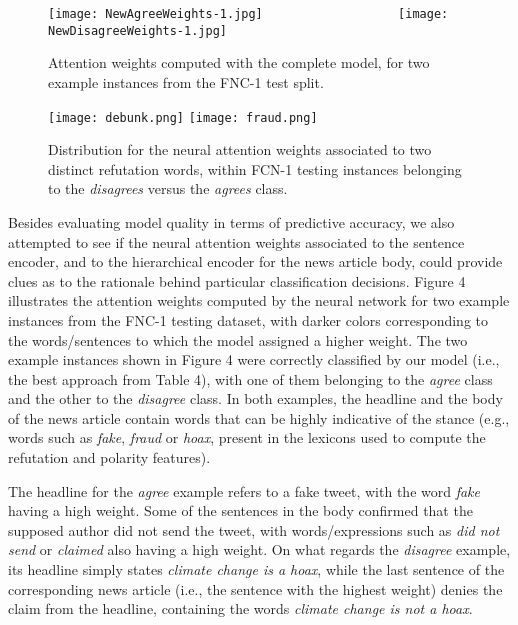 \begin{figure}[t!]
  \begin{center}
  \texttt{[image: NewAgreeWeights-1.jpg]} ~~~~~~~~~~~~~~~~~~ \texttt{[image: NewDisagreeWeights-1.jpg]}
  \caption{Attention weights computed with the complete model, for two example instances from the FNC-1 test split.}
  \label{fig:att1}
  \end{center}
\end{figure}



\begin{figure}[b!]
  \begin{center}
  \texttt{[image: debunk.png]}  
  \texttt{[image: fraud.png]} 
  \caption{Distribution for the neural attention weights associated to two distinct refutation words, within FCN-1 testing instances belonging to the {\it disagrees} versus the {\it agrees} class.}
  \label{fig:att1}
  \end{center}
\end{figure}

Besides evaluating model quality in terms of predictive accuracy, we also attempted to see if the neural attention weights associated to the sentence encoder, and to the hierarchical encoder for the news article body, could provide clues as to the rationale behind particular classification decisions. Figure 4 illustrates the attention weights computed by the neural network for two example instances from the FNC-1 testing dataset, with darker colors corresponding to the words/sentences to which the model assigned a higher weight. The two example instances shown in Figure 4 were correctly classified by our model (i.e., the best approach from Table 4), with one of them belonging to the \textit{agree} class and the other to the \textit{disagree} class. In both examples, the headline and the body of the news article contain words that can be highly indicative of the stance (e.g., words such as \textit{fake}, \textit{fraud} or \textit{hoax}, present in the lexicons used to compute the refutation and polarity features).

The headline for the \textit{agree} example refers to a fake tweet, with the word \textit{fake} having a high weight. Some of the sentences in the body confirmed that the supposed author did not send the tweet, with words/expressions such as {\it did not send} or {\it claimed} also having a high weight. On what regards the \textit{disagree} example, its headline simply states \textit{climate change is a hoax}, while the last sentence of the corresponding news article (i.e., the sentence with the highest weight) denies the claim from the headline, containing the words \textit{climate change is not a hoax}.

